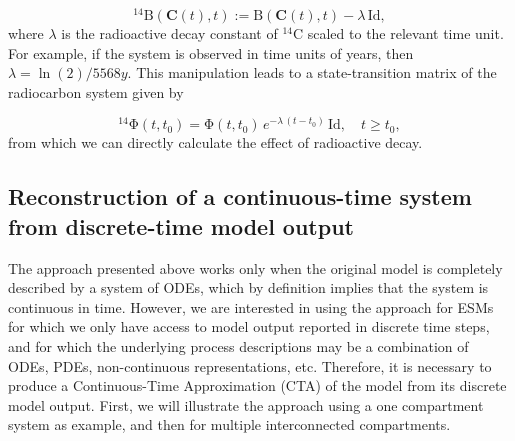 \documentclass[draft]{agujournal2019}
\renewcommand{\vec}[1]{\mathbf{#1}}
\newcommand{\tens}[1]{\mathrm{#1}}
\newcommand{\id}{\tens{Id}}
\begin{document}
    \begin{equation*}
        {}^{14}\tens{B}(\vec{C}(t),t) := \tens{B}(\vec{C}(t),t) - \lambda\,\id,
    \end{equation*}
    where $\lambda$ is the radioactive decay constant of ${}^{14}$C scaled to the relevant time unit.
    For example, if the system is observed in time units of years, then $\lambda=\ln(2)/5568 y$.
    This manipulation leads to a state-transition matrix of the radiocarbon system given by
    
    \begin{equation*}
        {}^{14}\tens{\Phi}(t,t_0) = \tens{\Phi}(t,t_0)\, e^{-\lambda\,(t-t_0)}\,\id, \quad t\geq t_0,
    \end{equation*}
    from which we can directly calculate the effect of radioactive decay.


\subsection{Reconstruction of a continuous-time system from discrete-time model output}
The approach presented above works only when the original model is completely described by a system of ODEs, which by definition implies that the system is continuous in time. However, we are interested in using the approach for ESMs for which we only have access to model output reported in discrete time steps, and for which the underlying process descriptions may be a combination of ODEs, PDEs, non-continuous representations, etc. Therefore, it is necessary to produce a Continuous-Time Approximation (CTA) of the model from its discrete model output. First, we will illustrate the approach using a one compartment system as example, and then for multiple interconnected compartments. 
    
\end{document}
